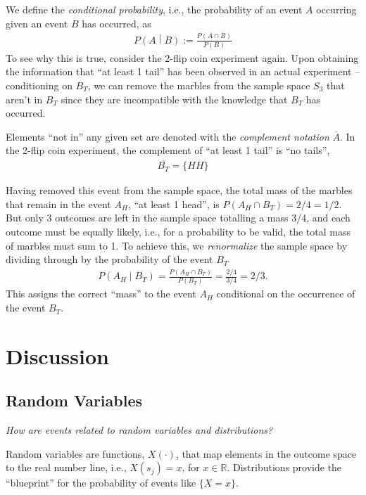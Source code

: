 \documentclass[11pt,a4paper]{article}
\begin{document}
We define the \emph{conditional probability}, 
i.e., the probability of an event \(A\) occurring given an event \(B\) has occurred, as
\begin{align}
P\left( A \middle| B \right) := \frac{P(A \cap B)}{P(B)}
\end{align}
To see why this is true, 
consider the 2-flip coin experiment again. 
Upon obtaining the information that ``at least 1 tail'' has been observed in an actual experiment 
-- conditioning on \(B_{T}\), 
we can remove the marbles from the sample space \(S_{3}\) that aren't in \(B_{T}\) 
since they are incompatible with the knowledge that \(B_{T}\) has occurred.

Elements ``not in'' any given set are denoted with the \emph{complement notation} \(\overline{A}\). 
In the 2-flip coin experiment, 
the complement of ``at least 1 tail'' is ``no tails'',
\begin{align}
\overline{B_{T}} = \{ HH\}
\end{align}

Having removed this event from the sample space, 
the total mass of the marbles that remain in the event \(A_{H}\), 
``at least 1 head'', 
is \(P\left( A_{H} \cap B_{T} \right) = 2/4 = 1/2\). 
But only 3 outcomes are left in the sample space totalling a mass 3/4, 
and each outcome must be equally likely, i.e., 
for a probability to be valid, 
the total mass of marbles must sum to 1. 
To achieve this, 
we \emph{renormalize} the sample space by dividing through by 
the probability of the event \(B_{T}\)
\begin{align}
P\left( A_{H} \middle| B_{T} \right) = 
\frac{P\left( A_{H} \cap B_{T} \right)}{P(B_{T})} = 
\frac{2/4}{3/4} = 2/3.
\end{align}
This assigns the correct ``mass'' to the event \(A_{H}\) 
conditional on the occurrence of the event \(B_{T}\).

\section{Discussion}

\subsection{Random Variables}

\emph{How are events related to random variables and distributions?}

Random variables are functions, \(X(\cdot)\), 
that map elements in
the outcome space to the real number line, i.e., \(X(s_j) = x\), for \(x \in \mathbb{R}\).
Distributions provide the ``blueprint'' for the probability of events like \(\{X=x\}\).
\end{document}
